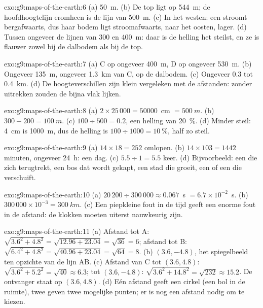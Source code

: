 \begin{solution}{exo:g9:maps-of-the-earth:6}
(a) \qty{50}{m}. (b) De top ligt op \qty{544}{m}; de hoofdhoogtelijn
eromheen is de lijn van \qty{500}{m}. (c) In het westen: een  stroomt
bergafwaarts, dus haar bodem ligt stroomafwaarts, naar het oosten, lager.
(d) Tussen ongeveer de lijnen van 300 en \qty{400}{m}: daar is de helling
het steilst, en ze is flauwer zowel bij de dalbodem als bij de top.
\end{solution}

\begin{solution}{exo:g9:maps-of-the-earth:7}
(a) C op ongeveer \qty{400}{m}, D op ongeveer \qty{530}{m}. (b) Ongeveer
\qty{135}{m}, ongeveer \qty{1.3}{km} van C, op de dalbodem. (c) Ongeveer
0.3 tot \qty{0.4}{km}. (d) De hoogteverschillen zijn klein vergeleken met
de afstanden: zonder uitrekken zouden de  bijna vlak lijken.
\end{solution}

\begin{solution}{exo:g9:maps-of-the-earth:8}
(a) $2 \times 25\,000 = \num{50000}$~cm $= \qty{500}{m}$. (b) $300 - 200 =
\qty{100}{m}$. (c) $100 \div 500 = 0.2$, een helling van \qty{20}{\%}. (d) Minder steil:
\qty{4}{cm} is \qty{1000}{m}, dus de helling is $100 \div 1000 = \qty{10}{\%}$,
half zo steil.
\end{solution}

\begin{solution}{exo:g9:maps-of-the-earth:9}
(a) $14 \times 18 = 252$ omlopen. (b) $14 \times 103 = 1442$ minuten,
ongeveer \qty{24}{h}: een dag. (c) $5.5 \div 1 = 5.5$ keer. (d) Bijvoorbeeld:
een  die zich terugtrekt, een bos dat wordt gekapt, een stad die
groeit, een  of een  die verschuift.
\end{solution}

\begin{solution}{exo:g9:maps-of-the-earth:10}
(a) $20\,200 \div 300\,000 \approx 0.067$~s $= 6.7 \times 10^{-2}$~s.
(b) $300\,000 \times 10^{-3} = \qty{300}{km}$. (c) Een piepkleine fout in
de tijd geeft een enorme fout in de afstand: de klokken moeten uiterst
nauwkeurig zijn.
\end{solution}

\begin{solution}{exo:g9:maps-of-the-earth:11}
(a) Afstand tot A: $\sqrt{3.6^2 + 4.8^2} = \sqrt{12.96 + 23.04} =
\sqrt{36} = 6$; afstand tot B: $\sqrt{6.4^2 + 4.8^2} = \sqrt{40.96 +
23.04} = \sqrt{64} = 8$. (b) $(3.6, -4.8)$, het spiegelbeeld ten opzichte
van de lijn AB. (c) Afstand van C tot $(3.6, 4.8)$: $\sqrt{3.6^2 + 5.2^2} =
\sqrt{40} \approx 6.3$; tot $(3.6, -4.8)$: $\sqrt{3.6^2 + 14.8^2} =
\sqrt{232} \approx 15.2$. De ontvanger staat op $(3.6, 4.8)$. (d) Eén
afstand geeft een cirkel (een bol in de ruimte), twee geven twee mogelijke
punten; er is nog een afstand nodig om te kiezen.
\end{solution}

